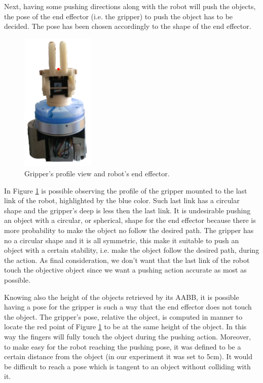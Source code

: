 Next, having some pushing directions along with the robot will push the objects, the pose of the end effector (i.e. the gripper) to push the object has to be decided. The pose has been chosen accordingly to the shape of the end effector.
\begin{figure}
\centering
\caption{Gripper's profile view and robot's end effector.}\label{fig:gripper_side}
\includegraphics[width=3.5cm]{Img/set_up/gripper_side2.png}
\end{figure}
In Figure \ref{fig:gripper_side}
is possible observing the profile of the gripper mounted to the last link of the robot, highlighted by the blue color. Such last link has a circular shape and the gripper's deep is less then the last link. It is undesirable pushing an object with a circular, or spherical, shape for the end effector because there is more probability to make the object no follow the desired path. The gripper has no a circular shape and it is all symmetric, this make it suitable to push an object with a certain stability, i.e. make the object follow the desired path, during the action. As final consideration, we don't want that the last link of the robot touch the objective object since we want a pushing action accurate as most as possible. 

Knowing also the height of the objects retrieved by its AABB, it is possible having a pose for the gripper is such a way that the end effector does not touch the object. The gripper's pose, relative the object, is computed in manner to locate the red point of Figure \ref{fig:gripper_side} to be at the same height of the object. In this way the fingers will fully touch the object during the pushing action. Moreover, to make easy for the robot reaching the pushing pose, it was defined to be a certain distance from the object (in our experiment it was set to 5cm). It would be difficult to reach a pose which is tangent to an object without colliding with it.  

